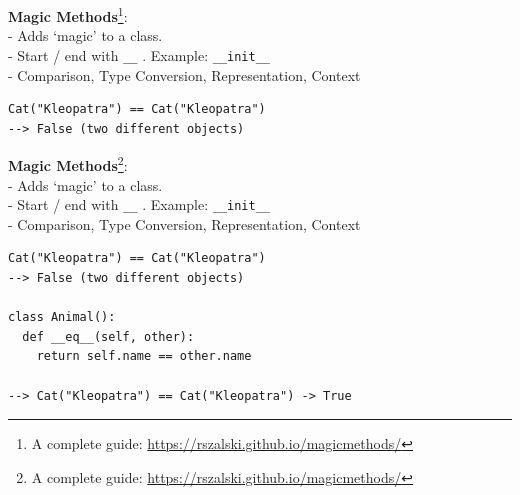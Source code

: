 \documentclass{beamer}
\begin{document}
\begin{frame}[fragile]
	\textbf{Magic Methods}\footnote{A complete guide: \url{https://rszalski.github.io/magicmethods/}}:\\
	- Adds `magic' to a class.\\
	- Start / end with \texttt{__} . Example: \texttt{__init__}\\
	- Comparison, Type Conversion, Representation, Context
	
	\begin{example}
		\begin{verbatim}
Cat("Kleopatra") == Cat("Kleopatra") 
--> False (two different objects)
		\end{verbatim}
	\end{example}
\end{frame}

\begin{frame}[fragile]
	\textbf{Magic Methods}\footnote{A complete guide: \url{https://rszalski.github.io/magicmethods/}}:\\
	- Adds `magic' to a class.\\
	- Start / end with \texttt{__} . Example: \texttt{__init__}\\
	- Comparison, Type Conversion, Representation, Context
	
	\begin{example}
		\begin{verbatim}
Cat("Kleopatra") == Cat("Kleopatra") 
--> False (two different objects)

class Animal():
  def __eq__(self, other):
  	return self.name == other.name
  
--> Cat("Kleopatra") == Cat("Kleopatra") -> True
		\end{verbatim}
	\end{example}
\end{frame}
\end{document}
